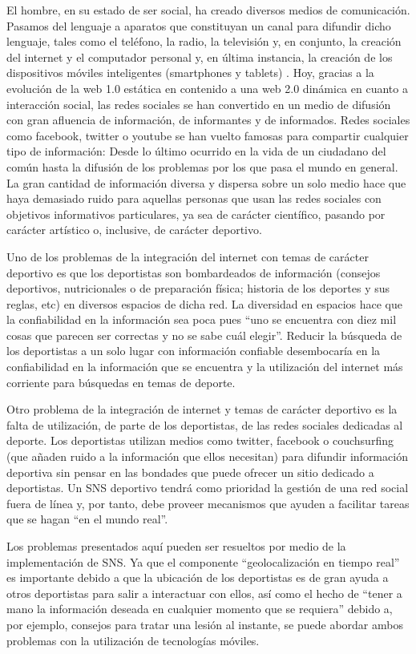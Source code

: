 El hombre, en su estado de ser social, ha creado diversos medios de comunicación. Pasamos del lenguaje a aparatos que constituyan un canal para difundir dicho lenguaje, tales como el teléfono, la radio, la televisión y, en conjunto, la creación del internet y el computador personal y, en última instancia, la creación de los dispositivos móviles inteligentes (smartphones y tablets) . Hoy, gracias a la evolución de la web 1.0 estática en contenido a una web 2.0 dinámica en cuanto a interacción social, las redes sociales se han convertido en un medio de difusión con gran afluencia de información, de informantes y de informados. Redes sociales como facebook, twitter o youtube se han vuelto famosas para compartir cualquier tipo de información: Desde lo último ocurrido en la vida de un ciudadano del común hasta la difusión de los problemas por los que pasa el mundo en general. La gran cantidad de información diversa y dispersa sobre un solo medio hace que haya demasiado ruido para aquellas personas que usan las redes sociales con objetivos informativos particulares, ya sea de carácter científico, pasando por carácter artístico o, inclusive, de carácter deportivo.

Uno de los problemas de la integración del internet con temas de carácter deportivo es que los deportistas son bombardeados de información (consejos deportivos, nutricionales o de preparación física; historia de los deportes y sus reglas, etc) en diversos espacios de dicha red. La diversidad en espacios hace que la confiabilidad en la información sea poca pues “uno se encuentra con diez mil cosas que parecen ser correctas y no se sabe cuál elegir”. Reducir la búsqueda de los deportistas a un solo lugar con información confiable desembocaría en la confiabilidad en la información que se encuentra y la utilización del internet más corriente para búsquedas en temas de deporte.

Otro problema de la integración de internet y temas de carácter deportivo es la falta de utilización, de parte de los deportistas, de las redes sociales dedicadas al deporte. Los deportistas utilizan medios como twitter, facebook o couchsurfing (que añaden ruido a la información que ellos necesitan) para difundir información deportiva sin pensar en las bondades que puede ofrecer un sitio dedicado a deportistas. Un SNS deportivo tendrá como prioridad la gestión de una red social fuera de línea y, por tanto, debe proveer mecanismos que ayuden a facilitar tareas que se hagan “en el mundo real”.

Los problemas presentados aquí pueden ser resueltos por medio de la implementación de SNS. Ya que el componente “geolocalización en tiempo real” es importante debido a que la ubicación de los deportistas es de gran ayuda a otros deportistas para salir a interactuar con ellos, así como el hecho de “tener a mano la información deseada en cualquier momento que se requiera” debido a, por ejemplo, consejos para tratar una lesión al instante, se puede abordar ambos problemas con la utilización de tecnologías móviles.

